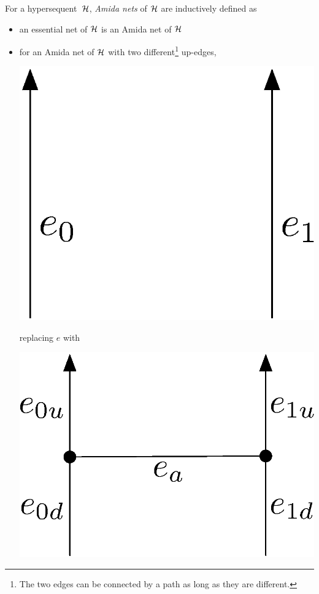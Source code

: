  \begin{definition}
  \label{def:amidanets}
For a hypersequent~$\mathcal{H}$,
\textit{Amida nets} of $\mathcal{H}$ are inductively
  defined as
\begin{itemize}
 \item an essential net of $\mathcal{H}$ is an Amida net of $\mathcal{H}$
 \item for an Amida net of $\mathcal{H}$ with two different\footnote{The two edges can
       be connected by a path as long as they are different.} up-edges,
	\begin{center}
	 \includegraphics[scale=0.4]{twoedges.eps}
	\end{center}
       replacing $e$ with
	\begin{center}
	 \includegraphics[scale=0.4]{twoedges_amida.eps}

\end{center}
\end{itemize}
\end{definition}
